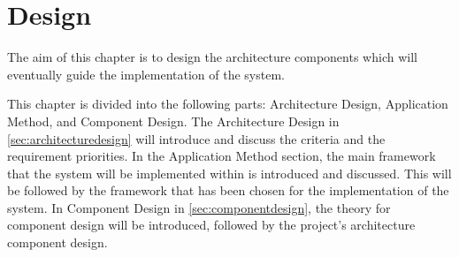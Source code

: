 \chapter{Design}\label{ch:design}
The aim of this chapter is to design the architecture components which will eventually guide the implementation of the system.

This chapter is divided into the following parts: Architecture Design, Application Method, and Component Design.
The Architecture Design in \cref{sec:architecturedesign} will introduce and discuss the criteria and the requirement priorities.
In the Application Method section, the main framework that the system will be implemented within is introduced and discussed.
This will be followed by the framework that has been chosen for the implementation of the system. %
In Component Design in \cref{sec:componentdesign}, the theory for component design will be introduced, followed by the project's architecture component design.





